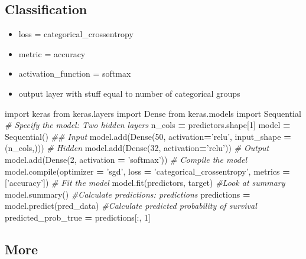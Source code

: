 \documentclass[]{book}
\newenvironment{Shaded}{\begin{snugshade}}{\end{snugshade}}
\newcommand{\DecValTok}[1]{\textcolor[rgb]{0.00,0.00,0.81}{#1}}
\newcommand{\StringTok}[1]{\textcolor[rgb]{0.31,0.60,0.02}{#1}}
\newcommand{\ImportTok}[1]{#1}
\newcommand{\CommentTok}[1]{\textcolor[rgb]{0.56,0.35,0.01}{\textit{#1}}}
\newcommand{\OperatorTok}[1]{\textcolor[rgb]{0.81,0.36,0.00}{\textbf{#1}}}
\newcommand{\BuiltInTok}[1]{#1}
\newcommand{\NormalTok}[1]{#1}
\begin{document}
\subsection{Classification}\label{classification}

\begin{itemize}
\item
  loss = categorical\_crossentropy
\item
  metric = accuracy
\item
  activation\_function = softmax
\item
  output layer with stuff equal to number of categorical groups
\end{itemize}

\begin{Shaded}
\begin{Highlighting}[]
\ImportTok{import}\NormalTok{ keras}
\ImportTok{from}\NormalTok{ keras.layers }\ImportTok{import}\NormalTok{ Dense}
\ImportTok{from}\NormalTok{ keras.models }\ImportTok{import}\NormalTok{ Sequential}
\CommentTok{# Specify the model: Two hidden layers}
\NormalTok{n_cols }\OperatorTok{=}\NormalTok{ predictors.shape[}\DecValTok{1}\NormalTok{]}
\NormalTok{model }\OperatorTok{=}\NormalTok{ Sequential()}
\CommentTok{## Input}
\NormalTok{model.add(Dense(}\DecValTok{50}\NormalTok{, activation}\OperatorTok{=}\StringTok{'relu'}\NormalTok{, input_shape }\OperatorTok{=}\NormalTok{ (n_cols,)))}
\CommentTok{# Hidden}
\NormalTok{model.add(Dense(}\DecValTok{32}\NormalTok{, activation}\OperatorTok{=}\StringTok{'relu'}\NormalTok{))}
\CommentTok{# Output}
\NormalTok{model.add(Dense(}\DecValTok{2}\NormalTok{, activation }\OperatorTok{=} \StringTok{'softmax'}\NormalTok{))}
\CommentTok{# Compile the model}
\NormalTok{model.}\BuiltInTok{compile}\NormalTok{(optimizer }\OperatorTok{=} \StringTok{'sgd'}\NormalTok{, loss }\OperatorTok{=} \StringTok{'categorical_crossentropy'}\NormalTok{, metrics }\OperatorTok{=}\NormalTok{ [}\StringTok{'accuracy'}\NormalTok{])}
\CommentTok{# Fit the model}
\NormalTok{model.fit(predictors, target)}
\CommentTok{#Look at summary}
\NormalTok{model.summary()}
\CommentTok{#Calculate predictions: predictions}
\NormalTok{predictions }\OperatorTok{=}\NormalTok{ model.predict(pred_data)}
\CommentTok{#Calculate predicted probability of survival}
\NormalTok{predicted_prob_true }\OperatorTok{=}\NormalTok{ predictions[:, }\DecValTok{1}\NormalTok{]}
\end{Highlighting}
\end{Shaded}

\subsection{More}\label{more}
\end{document}
